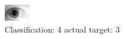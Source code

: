 \begin{figure}[h!]
\begin{center}
\includegraphics[width=0.60\columnwidth]{figures/ID1853_class_4_target_3.png}
\end{center}
\caption{ Classification: 4 actual target: 3}
\label{fig:ID1853_class_4_target_3}
\end{figure}
